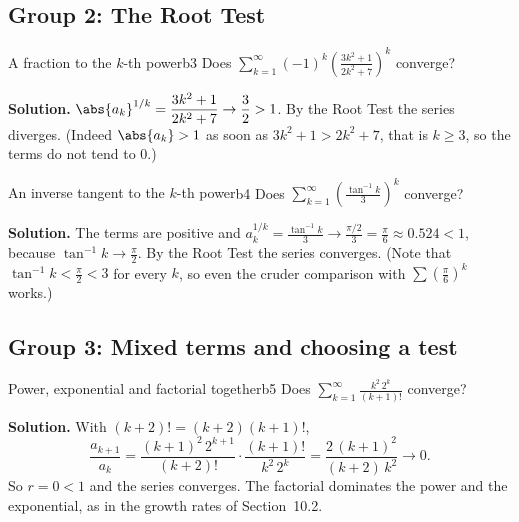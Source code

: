 \documentclass[11pt]{article}
\begin{document}
\subsection*{Group 2: The Root Test}

\begin{exmp}{A fraction to the $k$-th power}{b3}
Does $\displaystyle\sum_{k=1}^\infty(-1)^k\left(\frac{3k^2+1}{2k^2+7}\right)^k$ converge?

\textbf{Solution.} $\abs{a_k}^{1/k}=\dfrac{3k^2+1}{2k^2+7}\to\dfrac32>1$. By the Root Test the series diverges. (Indeed $\abs{a_k}>1$ as soon as $3k^2+1>2k^2+7$, that is $k\ge3$, so the terms do not tend to $0$.)
\end{exmp}

\begin{exmp}{An inverse tangent to the $k$-th power}{b4}
Does $\displaystyle\sum_{k=1}^\infty\left(\frac{\tan^{-1}k}3\right)^k$ converge?

\textbf{Solution.} The terms are positive and $a_k^{1/k}=\frac{\tan^{-1}k}3\to\frac{\pi/2}3=\frac\pi6\approx0.524<1$, because $\tan^{-1}k\to\frac\pi2$. By the Root Test the series converges. (Note that $\tan^{-1}k<\frac\pi2<3$ for every $k$, so even the cruder comparison with $\sum\left(\frac\pi6\right)^k$ works.)
\end{exmp}

\subsection*{Group 3: Mixed terms and choosing a test}

\begin{exmp}{Power, exponential and factorial together}{b5}
Does $\displaystyle\sum_{k=1}^\infty\frac{k^2\,2^k}{(k+1)!}$ converge?

\textbf{Solution.} With $(k+2)!=(k+2)(k+1)!$,
\[
\frac{a_{k+1}}{a_k}=\frac{(k+1)^2\,2^{k+1}}{(k+2)!}\cdot\frac{(k+1)!}{k^2\,2^k}=\frac{2\,(k+1)^2}{(k+2)\,k^2}\to0 .
\]
So $r=0<1$ and the series converges. The factorial dominates the power and the exponential, as in the growth rates of Section~10.2.
\end{exmp}
\end{document}
